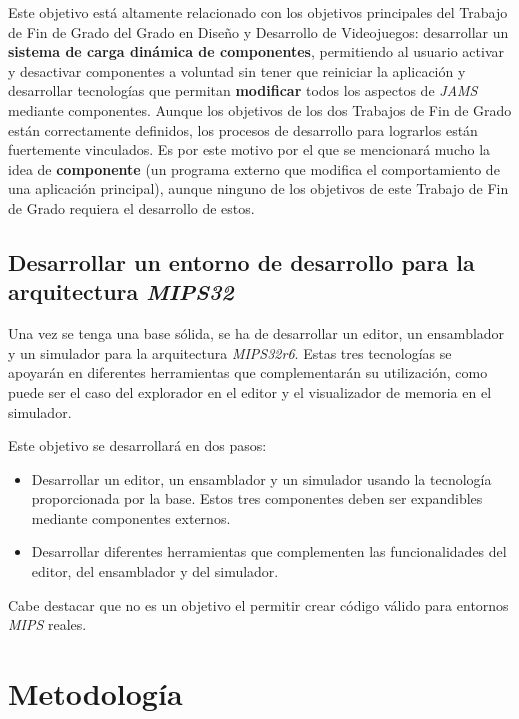 \noindent Este objetivo está altamente relacionado con los
objetivos principales del Trabajo de Fin de Grado del Grado en
Diseño y Desarrollo de Videojuegos: desarrollar un \textbf{sistema de carga
dinámica de componentes}, permitiendo al usuario activar y desactivar
componentes a voluntad sin tener que reiniciar la aplicación y
desarrollar tecnologías que permitan \textbf{modificar}
todos los aspectos de \textit{JAMS} mediante componentes.
Aunque los objetivos de los dos Trabajos de Fin de Grado están
correctamente definidos, los procesos de desarrollo para lograrlos están
fuertemente vinculados.
Es por este motivo por el que se mencionará mucho la idea de \textbf{componente}
(un programa externo que modifica el comportamiento de una aplicación principal),
aunque ninguno de los objetivos de este Trabajo de Fin de Grado requiera el
desarrollo de estos.

\subsection{Desarrollar un entorno de desarrollo para la arquitectura \textit{MIPS32}}
\label{subsec:desarrollar-un-entorno-de-desarrollo-para-la-arquitectura-mips32}

Una vez se tenga una base sólida, se ha de desarrollar un editor, un ensamblador
y un simulador para la arquitectura \textit{MIPS32r6}.
Estas tres tecnologías se apoyarán en diferentes herramientas que complementarán
su utilización, como puede ser el caso del explorador en el editor y el visualizador
de memoria en el simulador.

\noindent Este objetivo se desarrollará en dos pasos:

\begin{itemize}
    \item Desarrollar un editor, un ensamblador y un simulador usando la tecnología
    proporcionada por la base.
    Estos tres componentes deben ser expandibles mediante componentes externos.
    \item Desarrollar diferentes herramientas que complementen las funcionalidades
    del editor, del ensamblador y del simulador.
\end{itemize}

\noindent Cabe destacar que no es un objetivo el permitir crear código válido para
entornos \textit{MIPS} reales.

\section{Metodología}\label{sec:metodologia}

